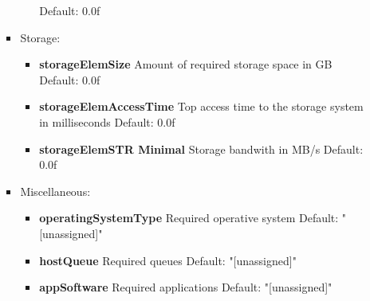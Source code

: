 \begin{itemize}
\begin{itemize}
\begin{itemize}
\begin{itemize}
							   Default: 0.0f
                       \end{itemize}
                \item Storage:
                       \begin{itemize}
			  \item \textbf{storageElemSize} Amount of required storage space in GB \newline
							 Default: 0.0f
			  \item \textbf{storageElemAccessTime} Top access time to the storage system in milliseconds \newline
							       Default: 0.0f
			  \item \textbf{storageElemSTR Minimal} Storage bandwith in MB/s \newline
								Default: 0.0f
                       \end{itemize}
                \item Miscellaneous:
		       \begin{itemize}
			  \item \textbf{operatingSystemType} Required operative system \newline
							     Default: "[unassigned]"
			  \item \textbf{hostQueue} Required queues \newline
						   Default: "[unassigned]"
			  \item \textbf{appSoftware} Required applications \newline
						     Default: "[unassigned]"
                       \end{itemize}
               \end{itemize}
       \end{itemize}


\end{itemize}
